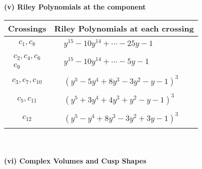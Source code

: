 \documentclass[1p]{elsarticle_modified}
\theoremstyle{definition}
\begin{document}
\newpage\renewcommand{\arraystretch}{1}
\flushleft \textbf{(v) Riley Polynomials at the component}\newline \\
\begin{tabular}{m{50pt}|m{274pt}}
Crossings & \hspace{64pt}Riley Polynomials at each crossing \\
\hline $$\begin{aligned}c_{1},c_{8}\end{aligned}$$&$\begin{aligned}
&y^{15}-10 y^{14}+\cdots-25 y-1
\end{aligned}$\\
\hline $$\begin{aligned}c_{2},c_{4},c_{6}\\c_{9}\end{aligned}$$&$\begin{aligned}
&y^{15}-10 y^{14}+\cdots-5 y-1
\end{aligned}$\\
\hline $$\begin{aligned}c_{3},c_{7},c_{10}\end{aligned}$$&$\begin{aligned}
&(y^5-5 y^4+8 y^3-3 y^2- y-1)^3
\end{aligned}$\\
\hline $$\begin{aligned}c_{5},c_{11}\end{aligned}$$&$\begin{aligned}
&(y^5+3 y^4+4 y^3+y^2- y-1)^3
\end{aligned}$\\
\hline $$\begin{aligned}c_{12}\end{aligned}$$&$\begin{aligned}
&(y^5- y^4+8 y^3-3 y^2+3 y-1)^3
\end{aligned}$\\
\hline
\end{tabular}\\~\\
\newpage\flushleft \textbf{(vi) Complex Volumes and Cusp Shapes}
\end{document}
